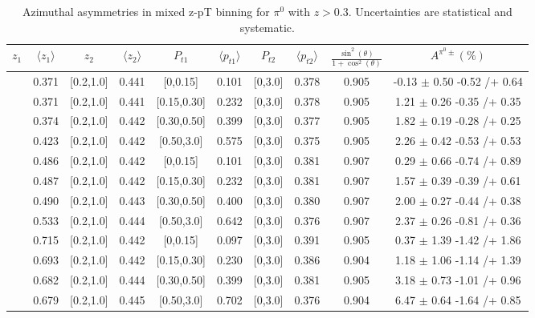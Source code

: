 \begin{table}[H]\scriptsize
\centering
\begin{tabular}{|c| c| c| c| c| c| c| c| c| c|}
\hline
$z_1$& $\langle  z_{1}  \rangle$ & $z_2$ & $\langle  z_{2}\rangle$& $P_{t1}$ & $\langle  p_{t1} \rangle$& $P_{t2}$ &  $\langle p_{t2}\rangle$ &$\frac{\sin^2(\theta)}{1+\cos^2(\theta)}$& $A^{\pi^0\pm}(\%)$   \\ \hline
[0.3,0.5]	&	0.371	&	[0.2,1.0]	&	0.441	&	[0,0.15]	&	0.101	&	[0,3.0]	&	0.378	&	0.905	&	-0.13	$\pm$ 	0.50	-0.52	/+	0.64	\\ \hline
[0.3,0.5]	&	0.371	&	[0.2,1.0]	&	0.441	&	[0.15,0.30]	&	0.232	&	[0,3.0]	&	0.378	&	0.905	&	1.21	$\pm$ 	0.26	-0.35	/+	0.35	\\ \hline
[0.3,0.5]	&	0.374	&	[0.2,1.0]	&	0.442	&	[0.30,0.50]	&	0.399	&	[0,3.0]	&	0.377	&	0.905	&	1.82	$\pm$ 	0.19	-0.28	/+	0.25	\\ \hline
[0.3,0.5]	&	0.423	&	[0.2,1.0]	&	0.442	&	[0.50,3.0]	&	0.575	&	[0,3.0]	&	0.375	&	0.905	&	2.26	$\pm$ 	0.42	-0.53	/+	0.53	\\ \hline
[0.5,0.7]	&	0.486	&	[0.2,1.0]	&	0.442	&	[0,0.15]	&	0.101	&	[0,3.0]	&	0.381	&	0.907	&	0.29	$\pm$ 	0.66	-0.74	/+	0.89	\\ \hline
[0.5,0.7]	&	0.487	&	[0.2,1.0]	&	0.442	&	[0.15,0.30]	&	0.232	&	[0,3.0]	&	0.381	&	0.907	&	1.57	$\pm$ 	0.39	-0.39	/+	0.61	\\ \hline
[0.5,0.7]	&	0.490	&	[0.2,1.0]	&	0.443	&	[0.30,0.50]	&	0.400	&	[0,3.0]	&	0.380	&	0.907	&	2.00	$\pm$ 	0.27	-0.44	/+	0.38	\\ \hline
[0.5,0.7]	&	0.533	&	[0.2,1.0]	&	0.444	&	[0.50,3.0]	&	0.642	&	[0,3.0]	&	0.376	&	0.907	&	2.37	$\pm$ 	0.26	-0.81	/+	0.36	\\ \hline
[0.7,1.0]	&	0.715	&	[0.2,1.0]	&	0.442	&	[0,0.15]	&	0.097	&	[0,3.0]	&	0.391	&	0.905	&	0.37	$\pm$ 	1.39	-1.42	/+	1.86	\\ \hline
[0.7,1.0]	&	0.693	&	[0.2,1.0]	&	0.442	&	[0.15,0.30]	&	0.230	&	[0,3.0]	&	0.386	&	0.904	&	1.18	$\pm$ 	1.06	-1.14	/+	1.39	\\ \hline
[0.7,1.0]	&	0.682	&	[0.2,1.0]	&	0.444	&	[0.30,0.50]	&	0.399	&	[0,3.0]	&	0.381	&	0.905	&	3.18	$\pm$ 	0.73	-1.01	/+	0.96	\\ \hline
[0.7,1.0]	&	0.679	&	[0.2,1.0]	&	0.445	&	[0.50,3.0]	&	0.702	&	[0,3.0]	&	0.376	&	0.904	&	6.47	$\pm$ 	0.64	-1.64	/+	0.85	\\ \hline
\end{tabular}
\caption{Azimuthal asymmetries in mixed z-pT binning for $\pi^0$ with $z>0.3$. Uncertainties are statistical and systematic.}
\label{tab:finaletaptbins}
\end{table}

